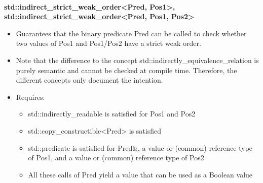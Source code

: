 \noindent
\hspace*{\fill} \\ %
\textbf{std::indirect\_strict\_weak\_order<Pred, Pos1>, std::indirect\_strict\_weak\_order<Pred, Pos1, Pos2>}

\begin{itemize}
\item
Guarantees that the binary predicate Pred can be called to check whether two values of Pos1 and Pos1/Pos2 have a strict weak order.

\item
Note that the difference to the concept std::indirectly\_equivalence\_relation is purely semantic and cannot be checked at compile time. Therefore, the different concepts only document the intention.

\item
Requires:
\begin{itemize}
\item
std::indirectly\_readable is satisfied for Pos1 and Pos2

\item
std::copy\_constructible<Pred> is satisfied

\item
std::predicate is satisfied for Pred\&, a value or (common) reference type of Pos1, and a value or (common) reference type of Pos2

\item
All these calls of Pred yield a value that can be used as a Boolean value
\end{itemize}
\end{itemize}











